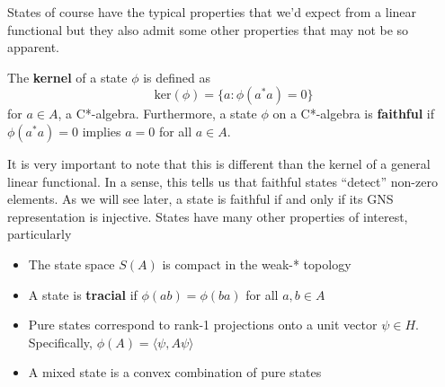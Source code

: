 \par

States of course have the typical properties that we'd expect from a linear functional
but they also admit some other properties that may not be so apparent. 

\begin{definition}
    The \textbf{kernel} of a state $\phi$ is defined as
    \begin{equation*}
        \text{ker}(\phi) = \{a : \phi(a^*a) = 0 \}
    \end{equation*}
    for $a \in A$, a C*-algebra. Furthermore, a state $\phi$ on a C*-algebra
    is \textbf{faithful} if $\phi(a^*a) = 0$ implies $a=0$ for all $a \in A$.
\end{definition}
It is very important to note that this is different than the kernel of a general
linear functional. In a sense, this tells us that faithful states ``detect'' non-zero
elements. As we will see later, a state is faithful if and only if its GNS representation
is injective. States have many other properties of interest, particularly
\begin{itemize}
    \item The state space $S(A)$ is compact in the weak-* topology
    \item A state is \textbf{tracial} if $\phi(ab) = \phi(ba)$ for all $a,b \in A$
    \item Pure states correspond to rank-1 projections onto a unit vector $\psi \in H$.
    Specifically, $\phi(A) = \langle \psi, A\psi \rangle$
    \item A mixed state is a convex combination of pure states
\end{itemize}